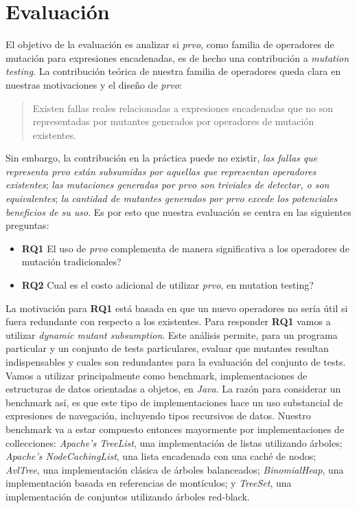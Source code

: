 \section{Evaluaci\'on}
\label{sec:evaluation.evaluation}

El objetivo de la evaluaci\'on es analizar si \emph{prvo}, como familia de operadores de mutaci\'on para expresiones encadenadas, es de hecho una contribuci\'on a \emph{mutation testing}. La contribuci\'on te\'orica de nuestra familia de operadores queda clara en nuestras motivaciones y el dise\~no de \emph{prvo}:
\begin{quote}
  Existen fallas reales relacionadas a expresiones encadenadas que no son representadas por mutantes generados por operadores de mutaci\'on existentes.
\end{quote}
Sin embargo, la contribuci\'on en la pr\'actica puede no existir, \emph{las fallas que representa prvo est\'an subsumidas por aquellas que representan operadores existentes}; \emph{las mutaciones generadas por prvo son triviales de detectar, o son equivalentes}; \emph{la cantidad de mutantes generados por prvo excede los potenciales beneficios de su uso}. Es por esto que nuestra evaluaci\'on se centra en las siguientes preguntas:
\begin{itemize}
	\item \textbf{RQ1} El uso de \emph{prvo} complementa de manera significativa a los operadores de mutaci\'on tradicionales?
	
	\item \textbf{RQ2} Cual es el costo adicional de utilizar \emph{prvo}, en mutation testing?
\end{itemize}

La motivaci\'on para \textbf{RQ1} est\'a basada en que un nuevo operadores no ser\'ia \'util si fuera redundante con respecto a los existentes. Para responder \textbf{RQ1} vamos a utilizar \emph{dynamic mutant subsumption}. Este an\'alisis permite, para un programa particular y un conjunto de tests particulares, evaluar que mutantes resultan indispensables y cuales son redundantes para la evaluaci\'on del conjunto de tests. Vamos a utilizar principalmente como benchmark, implementaciones de estructuras de datos orientadas a objetos, en \emph{Java}. La raz\'on para considerar un benchmark as\'i, es que este tipo de implementaciones hace un uso substancial de expresiones de navegaci\'on, incluyendo tipos recursivos de datos. Nuestro benchmark va a estar compuesto entonces mayormente por implementaciones de collecciones:  \emph{Apache's TreeList}, una implementaci\'on de listas utilizando \'arboles; \emph{Apache's NodeCachingList}, una lista encadenada con una cach\'e de nodos; \emph{AvlTree}, una implementaci\'on cl\'asica de \'arboles balanceados; \emph{BinomialHeap}, una implementaci\'on basada en referencias de mont\'iculos; y \emph{TreeSet}, una implementaci\'on de conjuntos utilizando \'arboles red-black. %

